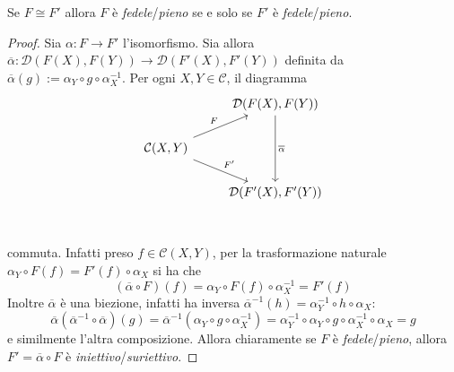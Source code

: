 \begin{proposition}{}
    Se \(F \cong F'\) allora \(F\) è \emph{fedele}/\emph{pieno} se e solo se \(F'\) è \emph{fedele}/\emph{pieno}.
\end{proposition}
\begin{proof}{}
    Sia \(\alpha : F \to F'\) l'isomorfismo. Sia allora \(\overline{\alpha} :
    \mathcal{D}{(F{(X)}, F{(Y)})} \to \mathcal{D}{(F'{(X)}, F'{(Y)})}\) definita
    da \(\overline{\alpha}{(g)} := \alpha_Y \circ g \circ \alpha_X^{-1}\).
    Per ogni \(X, Y \in \mathcal{C}\), il diagramma
\[\begin{tikzcd}
	& {\mathcal{D}(F(X),F(Y))} \\
	{\mathcal{C}(X,Y)} \\
	& {\mathcal{D}(F'(X),F'(Y))} \\
	\arrow["{\overline{\alpha}}", from=1-2, to=3-2]
	\arrow["F", from=2-1, to=1-2]
	\arrow["{F'}", from=2-1, to=3-2]
\end{tikzcd}\]
commuta. Infatti preso \(f \in \mathcal{C}{(X, Y)}\), per la trasformazione
naturale \(\alpha_Y \circ F{(f)} = F'{(f)} \circ \alpha_X\) si ha che 
\[
  {(\overline{\alpha} \circ F)}{(f)} = \alpha_Y \circ F{(f)} \circ \alpha_X^{-1}
  = F'{(f)}
\]
Inoltre \(\overline{\alpha}\) è una biezione, infatti ha inversa \(\overline{\alpha}^{-1}{(h)} = \alpha_Y^{-1} \circ h \circ \alpha_X\): \[\overline{\alpha} {( \overline{\alpha}^{-1} \circ \overline{\alpha})}{(g)} = \overline{\alpha}^{-1}
{(\alpha_Y \circ g \circ \alpha_X^{-1})} = \alpha_Y^{-1} \circ \alpha_Y \circ g
\circ \alpha_X^{-1} \circ \alpha_X = g
\]
e similmente l'altra composizione. Allora chiaramente se \(F\) è \emph{fedele}/\emph{pieno}, allora \(F'  = \overline{\alpha} \circ F \) è \emph{iniettivo}/\emph{suriettivo}.

\end{proof}

